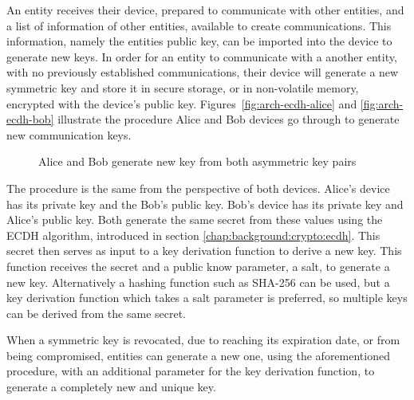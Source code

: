 An entity receives their device, prepared to communicate with other entities, and a list of information of other entities, available to create communications. This information, namely the entities public key, can be imported into the device to generate new keys.
In order for an entity to communicate with a another entity, with no previously established communications, their device will generate a new symmetric key and store it in secure storage, or in non-volatile memory, encrypted with the device's public key.
Figures~\ref{fig:arch-ecdh-alice} and \ref{fig:arch-ecdh-bob} illustrate the procedure Alice and Bob devices go through to generate new communication keys.

\begin{figure}[h!]
	\centering     %
	\caption{Alice and Bob generate new key from both asymmetric key pairs}
\end{figure}

The procedure is the same from the perspective of both devices. Alice's device has its private key and the Bob's public key. Bob's device has its private key and Alice's public key. Both generate the same secret from these values using the \ac{ECDH} algorithm, introduced in section \ref{chap:background:crypto:ecdh}.
This secret then serves as input to a key derivation function to derive a new key. This function receives the secret and a public know parameter, a salt, to generate a new key. Alternatively a hashing function such as SHA-256 can be used, but a key derivation function which takes a salt parameter is preferred, so multiple keys can be derived from the same secret.


When a symmetric key is revocated, due to reaching its expiration date, or from being compromised, entities can generate a new one, using the aforementioned procedure, with an additional parameter for the key derivation function, to generate a completely new and unique key.
